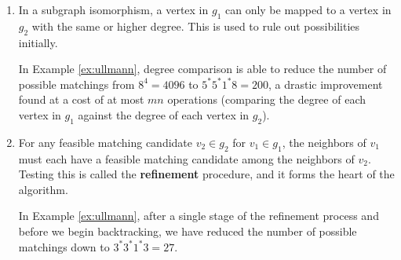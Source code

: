 \documentclass[12pt]{thesis}
\theoremstyle{plain}
\theoremstyle{definition}
\theoremstyle{remark}
\begin{document}
\begin{enumerate}
\item In a subgraph isomorphism, a vertex in $g_1$ can only be mapped to a vertex in $g_2$ with the same or higher degree. This is used to rule out possibilities initially. 

In Example \ref{ex:ullmann}, degree comparison is able to reduce the number of possible matchings from $8^4=4096$ to $5^*5^*1^*8=200$, a drastic improvement found at a cost of at most $mn$ operations (comparing the degree of each vertex in $g_1$ against the degree of each vertex in $g_2$).

\item For any feasible matching candidate $v_2\in g_2$ for $v_1\in g_1$, the neighbors of $v_1$ must each have a feasible matching candidate among the neighbors of $v_2$. Testing this is called the \textbf{refinement} procedure, and it forms the heart of the algorithm.

In Example \ref{ex:ullmann}, after a single stage of the refinement process and before we begin backtracking, we have reduced the number of possible matchings down to $3^*3^*1^*3=27$.
\end{enumerate}
\end{document}
